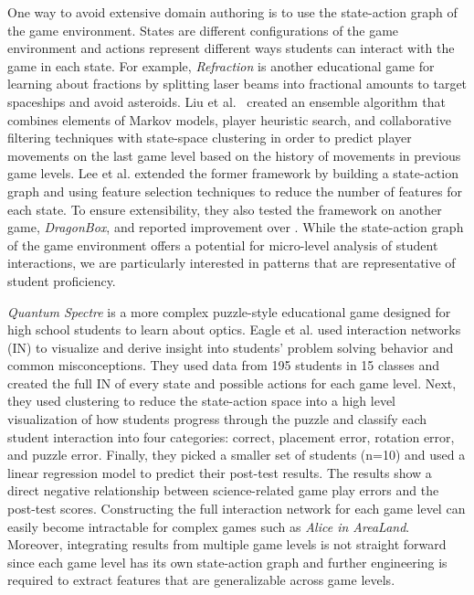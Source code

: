 \documentclass{sigchi}
\begin{document}
	One way to avoid extensive domain authoring is to use the state-action graph of the game environment. 
	States are different configurations of the game environment and actions represent different ways students can interact with the game in each state. For example, \textit {Refraction} \cite{andersen2010gameplay} is another educational game for learning about fractions by splitting laser beams into fractional amounts to target spaceships and avoid asteroids. 
	Liu et al.~\cite{liu2013predicting} created an ensemble algorithm that combines elements of Markov models, player heuristic search, and collaborative filtering techniques with state-space clustering in order to predict player movements on the last game level based on the history of movements in previous game levels. 
	Lee et al. \cite{lee2014learning} extended the former framework by building a state-action graph and using feature selection techniques to reduce the number of features for each state. 
	To ensure extensibility, they also tested the framework on another game, \textit {DragonBox}, and reported improvement over \cite{liu2013predicting}.
	While the state-action graph of the game environment offers a potential for micro-level analysis of student interactions, we are particularly interested in patterns that are representative of student proficiency.
	
	\textit {Quantum Spectre} is a more complex puzzle-style educational game designed for high school students to learn about optics. 
	Eagle et al. \cite{eagle2015measuring} used interaction networks (IN) to visualize and derive insight into students' problem solving behavior and common misconceptions. 
	They used data from 195 students in 15 classes and created the full IN of every state and possible actions for each game level. 
	Next, they used clustering to reduce the state-action space into a high level visualization of how students progress through the puzzle and classify each student interaction into four categories: correct, placement error, rotation error, and puzzle error. 
	Finally, they picked a smaller set of students (n=10) and used a linear regression model to predict their post-test results.
	The results show a direct negative relationship between science-related game play errors and the post-test scores.
	Constructing the full interaction network for each game level 
	can easily become intractable for complex games such as \textit{Alice in AreaLand}. Moreover, integrating results from multiple game levels is not straight forward since each game level has its own state-action graph and further engineering is required to extract features that are generalizable across game levels. 
\end{document}
